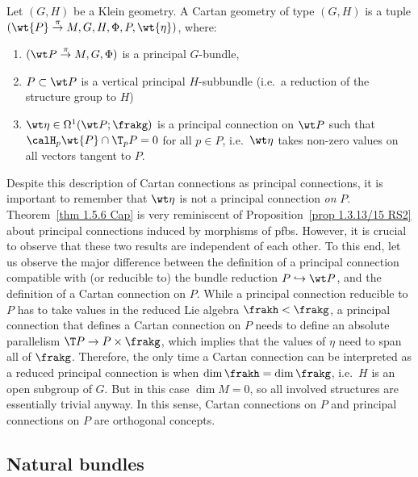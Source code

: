 \begin{defn}\label{def cartan geometry II}
    Let $(G,H)$ be a Klein geometry. A Cartan geometry of type $(G,H)$ is a tuple $(\wt{P}\overset{\pi}{\to}M,G,H,\Phi,P,\wt{\eta})$, where:
    \begin{enumerate}
        \item $(\wt P\overset{\pi}{\to}M,G,\Phi)$ is a principal $G$-bundle,
        \item $P\subset \wt P$ is a vertical principal $H$-subbundle (i.e.\ a reduction of the structure group to $H$)
        \item $\wt\eta\in\Omega^1(\wt P;\frakg)$ is a principal connection on $\wt P$ such that $\calH_p \wt{P}\cap \T_pP=0$ for all $p\in P$, i.e.\ $\wt\eta$ takes non-zero values on all vectors tangent to $P$.
    \end{enumerate}
\end{defn}

\begin{rem}
    Despite this description of Cartan connections as principal connections, it is important to remember that $\wt\eta$ is not a principal connection \emph{on} $P$. Theorem~\ref{thm 1.5.6 Cap} is very reminiscent of Proposition~\ref{prop 1.3.13/15 RS2} about principal connections induced by morphisms of \glspl{pfb}. However, it is crucial to observe that these two results are independent of each other. To this end, let us observe the major difference between the definition of a principal connection compatible with (or reducible to) the bundle reduction $P\hookrightarrow \wt P$, and the definition of a Cartan connection on $P$. While a principal connection reducible to $P$ has to take values in the reduced Lie algebra $\frakh<\frakg$, a principal connection that defines a Cartan connection on $P$ needs to define an absolute parallelism $\T P\to P\times\frakg$, which implies that the values of $\eta$ need to span all of $\frakg$. Therefore, the only time a Cartan connection can be interpreted as a reduced principal connection is when $\dim\frakh=\dim\frakg$, i.e.\ $H$ is an open subgroup of $G$. But in this case $\dim M=0$, so all involved structures are essentially trivial anyway. In this sense, Cartan connections on $P$ and principal connections on $P$ are orthogonal concepts.
\end{rem}






\subsection{Natural bundles}

